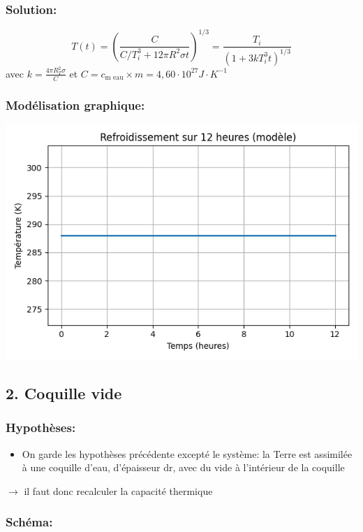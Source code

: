 \documentclass[a4paper,12pt]{article}
\begin{document}
\subsubsection*{Solution:} 
\[
T(t) = \left( \frac{C}{C/T_i^3 + 12\pi R^2 \sigma t} \right)^{1/3} 
= \frac{T_i}{\left(1 + 3k T_i^3 t \right)^{1/3}}
\]
avec \(k=\frac{4\pi R_T^2 \sigma}{C}\)
et \(C=c_{\text{m eau}}\times m=4,60 \cdot 10^{27} J\cdot K^{-1}\)

\bigskip



\bigskip
\subsubsection*{Modélisation graphique:}
\begin{center}
  \includegraphics[width=0.8\linewidth]{../modele1/figures/modele1.png}
\end{center}
    
    

\subsection*{2. Coquille vide }
\subsubsection*{Hypothèses:}
\begin{itemize}
    \item On garde les hypothèses précédente excepté le système: la Terre est assimilée à une coquille d'eau, d'épaisseur dr, avec du vide à l'intérieur de la coquille 
    
\end{itemize}
$\rightarrow$ il faut donc recalculer la capacité thermique 

\subsubsection*{Schéma:} 
\end{document}
